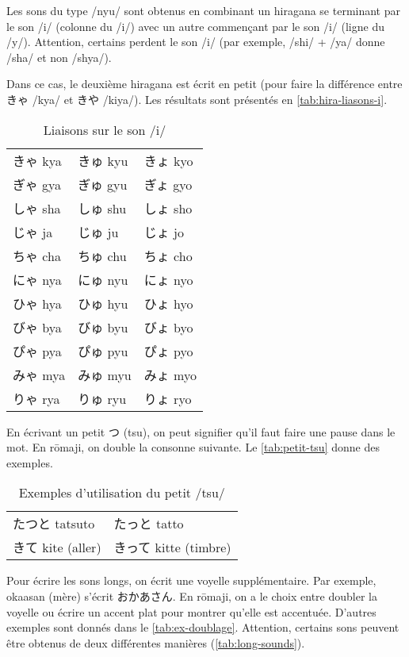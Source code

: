 \documentclass[a4paper,10pt,french,openany]{memoir}
\begin{document}
Les sons du type /nyu/ sont obtenus en combinant un hiragana se terminant par le son /i/ (colonne du /i/) avec un autre commençant par le son /i/ (ligne du /y/). Attention, certains perdent le son /i/ (par exemple, /shi/ + /ya/ donne /sha/ et non /shya/).

Dans ce cas, le deuxième hiragana est écrit en petit (pour faire la différence entre きゃ /kya/ et きや /kiya/). Les résultats sont présentés en \autoref{tab:hira-liasons-i}.

\begin{table}[htbp]
 \centering
 \begin{tabular}{lll}
  きゃ kya& きゅ kyu& きょ kyo\\
  ぎゃ gya& ぎゅ gyu& ぎょ gyo\\
  しゃ sha& しゅ shu& しょ sho\\
  じゃ ja & じゅ ju & じょ jo \\
  ちゃ cha& ちゅ chu& ちょ cho\\
  にゃ nya& にゅ nyu& にょ nyo\\
  ひゃ hya& ひゅ hyu& ひょ hyo\\
  びゃ bya& びゅ byu& びょ byo\\
  ぴゃ pya& ぴゅ pyu& ぴょ pyo\\
  みゃ mya& みゅ myu& みょ myo\\
  りゃ rya& りゅ ryu& りょ ryo\\
 \end{tabular}
 \caption{Liaisons sur le son /i/}
 \label{tab:hira-liasons-i}
\end{table}

En écrivant un petit つ (tsu), on peut signifier qu'il faut faire une pause dans le mot. En rōmaji, on double la consonne suivante. Le \autoref{tab:petit-tsu} donne des exemples.

\begin{table}[htbp]
 \centering
 \begin{tabular}{ll}
  たつと tatsuto & たっと tatto \\
  きて kite (aller) & きって kitte (timbre)
 \end{tabular}
 \caption{Exemples d'utilisation du petit /tsu/}
 \label{tab:petit-tsu}
\end{table}

Pour écrire les sons longs, on écrit une voyelle supplémentaire. Par exemple, okaasan (mère) s'écrit おかあさん. En rōmaji, on a le choix entre doubler la voyelle ou écrire un accent plat pour montrer qu'elle est accentuée. D'autres exemples sont donnés dans le \autoref{tab:ex-doublage}. Attention, certains sons peuvent être obtenus de deux différentes manières (\autoref{tab:long-sounds}).
\end{document}
